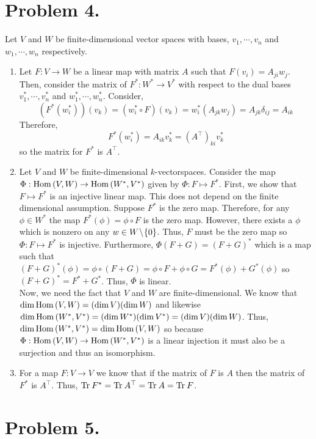 \documentclass[12pt]{extarticle}
\begin{document}
\section*{Problem 4.}
Let $V$ and $W$ be finite-dimensional vector spaces with bases, $v_1, \cdots, v_n$ and $w_1, \cdots, w_n$ respectively.   
\begin{enumerate}
\item Let $F : V \to W$ be a linear map with matrix $A$ such that $F(v_i) = A_{ji} w_j$. Then, consider the matrix of $F^* : W^* \to V^*$ with respect to the dual bases $v_1^*, \cdots, v_n^*$ and $w_1^*, \cdots, w_n^*$. Consider,
\[ (F^*(w_i^*))(v_k) = (w_i^* \circ F)(v_k) = w_i^*(A_{jk} w_j) = A_{jk} \delta_{ij} = A_{ik} \]
Therefore,
\[ F^*(w_i^*) = A_{ik} v^*_k = (A^\top)_{ki} v_k^*\]
so the matrix for $F^*$ is $A^\top$.

\item Let $V$ and $W$ be finite-dimensional $k$-vectorspaces. Consider the map $\Phi : \mathrm{Hom}\left( V, W \right) \to \mathrm{Hom}\left( W^*, V^* \right)$ given by $\Phi : F \mapsto F^*$. First, we show that $F \mapsto F^*$ is an injective linear map. This does not depend on the finite dimensional assumption. Suppose $F^*$ is the zero map. Therefore, for any $\phi \in W^*$ the map $F^*(\phi) = \phi \circ F$ is the zero map. However, there exists a $\phi$ which is nonzero on any $w \in W \! \setminus \! \{0\}$. Thus, $F$ must be the zero map so $\Phi : F \mapsto F^*$ is injective. Furthermore, $\Phi(F + G) = (F + G)^*$ which is a map such that $(F + G)^*(\phi) = \phi \circ (F + G) = \phi \circ F + \phi \circ G = F^*(\phi) + G^*(\phi)$ so $(F + G)^* = F^* + G^*$. Thus, $\Phi$ is linear. \bigskip \\ 
Now, we need the fact that $V$ and $W$ are finite-dimensional. We know that $\dim{\mathrm{Hom}\left( V, W \right)} = (\dim{V})(\dim{W})$ and likewise $\dim{\mathrm{Hom}\left( W^*, V^* \right)} = (\dim{W^*})(\dim{V^*}) = (\dim{V})(\dim{W})$. Thus, $\dim{\mathrm{Hom}\left( W^*, V^* \right)} = \dim{\mathrm{Hom}\left( V, W \right)}$ so because $\Phi : \mathrm{Hom}\left( V, W \right) \to \mathrm{Hom}\left( W^*, V^* \right)$ is a linear injection it must also be a surjection and thus an isomorphism. 

\item For a map $F : V \to V$ we know that if the matrix of $F$ is $A$ then the matrix of $F^*$ is $A^\top$. Thus, $\mathrm{Tr} \: F^* = \mathrm{Tr} \: A^\top = \mathrm{Tr} \: A = \mathrm{Tr} \: F$. 
\end{enumerate}

\section*{Problem 5.}
\end{document}
